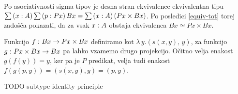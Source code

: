 \begin{dokaz}
  Po asociativnosti sigma tipov je desna stran ekvivalence ekvivalentna tipu
  \(\sum \left( x : A \right) \sum \left( p : Px \right) Bx = \sum \left( x : A \right) (Px \times Bx)\).
  Po posledici \ref{equiv-tot} torej zadošča pokazati, da za vsak \(x : A\)
  obstaja ekvivalenca \(Bx \simeq Px \times Bx\).

  Funkcijo \(f \,\colon Bx \to Px \times Bx\) definiramo kot
  \(\lambda \, y. \left(s(x,y),\, y\right)\), za funkcijo \(g \,\colon Px \times Bx \to Bx\) pa
  lahko vzamemo drugo projekcijo. Očitno velja enakost \(g(f(y)) = y\), ker pa je \(P\)
  predikat, velja tudi enakost
  \(f(g\left(p, y\right)) = \left(s(x, y), y\right) = \left(p, y\right)\).

\end{dokaz}

\begin{trditev}
  \label{subtype-id}
  TODO subtype identity principle
\end{trditev}


